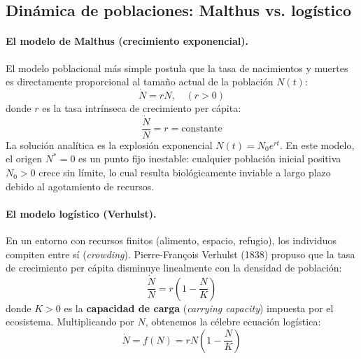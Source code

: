 \subsection{Dinámica de poblaciones: Malthus vs. logístico}

\paragraph{El modelo de Malthus (crecimiento exponencial).}
El modelo poblacional más simple postula que la tasa de nacimientos y muertes es directamente proporcional al tamaño actual de la población $N(t)$:
\begin{equation}
    \dot{N} = r N, \quad (r > 0)
    \label{eq:malthus}
\end{equation}
donde $r$ es la tasa intrínseca de crecimiento per cápita:
\begin{equation}
    \frac{\dot{N}}{N} = r = \text{constante}
\end{equation}
La solución analítica es la explosión exponencial $N(t) = N_0 e^{rt}$. En este modelo, el origen $N^* = 0$ es un punto fijo inestable: cualquier población inicial positiva $N_0 > 0$ crece sin límite, lo cual resulta biológicamente inviable a largo plazo debido al agotamiento de recursos.

\paragraph{El modelo logístico (Verhulst).}
En un entorno con recursos finitos (alimento, espacio, refugio), los individuos compiten entre sí (\emph{crowding}). Pierre-François Verhulst (1838) propuso que la tasa de crecimiento per cápita disminuye linealmente con la densidad de población:
\begin{equation}
    \frac{\dot{N}}{N} = r \left(1 - \frac{N}{K}\right)
\end{equation}
donde $K > 0$ es la \textbf{capacidad de carga} (\emph{carrying capacity}) impuesta por el ecosistema. Multiplicando por $N$, obtenemos la célebre ecuación logística:
\begin{equation}
    \dot{N} = f(N) = r N \left(1 - \frac{N}{K}\right)
    \label{eq:logistico}
\end{equation}

